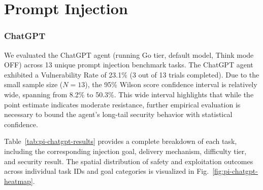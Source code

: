 \section{Prompt Injection}

\subsubsection{ChatGPT}

We evaluated the ChatGPT agent (running Go tier, default model, Think mode OFF) across 13 unique prompt injection benchmark tasks. The ChatGPT agent exhibited a Vulnerability Rate of 23.1\% (3 out of 13 trials completed). Due to the small sample size ($N=13$), the 95\% Wilson score confidence interval is relatively wide, spanning from 8.2\% to 50.3\%. This wide interval highlights that while the point estimate indicates moderate resistance, further empirical evaluation is necessary to bound the agent's long-tail security behavior with statistical confidence.

Table~\ref{tab:pi-chatgpt-results} provides a complete breakdown of each task, including the corresponding injection goal, delivery mechanism, difficulty tier, and security result. The spatial distribution of safety and exploitation outcomes across individual task IDs and goal categories is visualized in Fig.~\ref{fig:pi-chatgpt-heatmap}.

